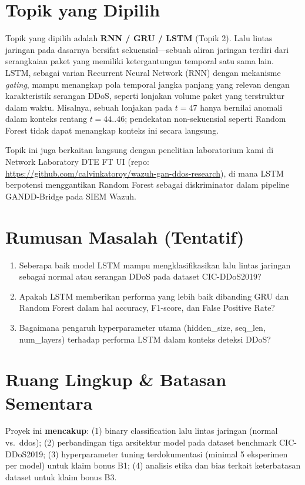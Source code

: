 \documentclass[11pt,a4paper,oneside]{report}
\begin{document}
\section{Topik yang Dipilih}

Topik yang dipilih adalah \textbf{RNN / GRU / LSTM} (Topik 2). Lalu lintas jaringan pada dasarnya bersifat sekuensial---sebuah aliran jaringan terdiri dari serangkaian paket yang memiliki ketergantungan temporal satu sama lain. LSTM, sebagai varian Recurrent Neural Network (RNN) dengan mekanisme \textit{gating}, mampu menangkap pola temporal jangka panjang yang relevan dengan karakteristik serangan DDoS, seperti lonjakan volume paket yang terstruktur dalam waktu. Misalnya, sebuah lonjakan pada $t=47$ hanya bernilai anomali dalam konteks rentang $t=44..46$; pendekatan non-sekuensial seperti Random Forest tidak dapat menangkap konteks ini secara langsung.

Topik ini juga berkaitan langsung dengan penelitian laboratorium kami di Network Laboratory DTE FT UI (repo: \url{https://github.com/calvinkatoroy/wazuh-gan-ddos-research}), di mana LSTM berpotensi menggantikan Random Forest sebagai diskriminator dalam pipeline GANDD-Bridge pada SIEM Wazuh.

\section{Rumusan Masalah (Tentatif)}

\begin{enumerate}[label=RM\arabic*.,leftmargin=*]
    \item Seberapa baik model LSTM mampu mengklasifikasikan lalu lintas jaringan sebagai normal atau serangan DDoS pada dataset CIC-DDoS2019?
    \item Apakah LSTM memberikan performa yang lebih baik dibanding GRU dan Random Forest dalam hal accuracy, F1-score, dan False Positive Rate?
    \item Bagaimana pengaruh hyperparameter utama (hidden\_size, seq\_len, num\_layers) terhadap performa LSTM dalam konteks deteksi DDoS?
\end{enumerate}

\section{Ruang Lingkup \& Batasan Sementara}

Proyek ini \textbf{mencakup}: (1) binary classification lalu lintas jaringan (normal vs.\ ddos); (2) perbandingan tiga arsitektur model pada dataset benchmark CIC-DDoS2019; (3) hyperparameter tuning terdokumentasi (minimal 5 eksperimen per model) untuk klaim bonus B1; (4) analisis etika dan bias terkait keterbatasan dataset untuk klaim bonus B3.
\end{document}
